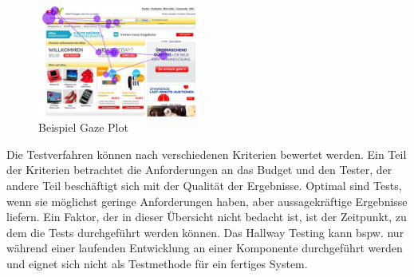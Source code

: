 \begin{figure}[H]
 \centering
 \includegraphics[width=0.48\textwidth]{grafiken/gaze_plot.png}
 \caption{Beispiel Gaze Plot \cite{Henrici2010}}
 \label{fig:gazePlot}
\end{figure}
Die Testverfahren können nach verschiedenen Kriterien bewertet werden. Ein Teil der Kriterien betrachtet die Anforderungen an das Budget und den Tester, der andere Teil beschäftigt sich mit der Qualität der Ergebnisse. Optimal sind Tests, wenn sie möglichst geringe Anforderungen haben, aber aussagekräftige Ergebnisse liefern. Ein Faktor, der in dieser Übersicht nicht bedacht ist, ist der Zeitpunkt, zu dem die Tests durchgeführt werden können. Das Hallway Testing kann bspw. nur während einer laufenden Entwicklung an einer Komponente durchgeführt werden und eignet sich nicht als Testmethode für ein fertiges System.
